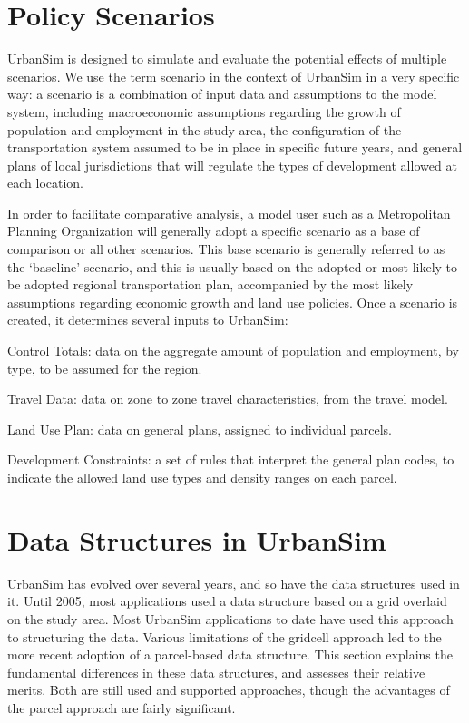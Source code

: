 \section{Policy Scenarios}

UrbanSim is designed to simulate and evaluate the potential effects of multiple scenarios.  We use the term scenario in the context of UrbanSim in a very
specific way: a scenario is a combination of input data and assumptions to the model system, including macroeconomic assumptions regarding the growth of population and employment in the study area, the configuration of the transportation system assumed to be in place in specific future years, and
general plans of local jurisdictions that will regulate the types of development allowed at each location.

In order to facilitate comparative analysis, a model user such as a Metropolitan Planning Organization will generally adopt a specific scenario as a base of comparison or all other scenarios.  This base scenario is generally referred to as the `baseline' scenario, and this is usually based on the adopted or most
likely to be adopted regional transportation plan, accompanied by the most likely assumptions regarding economic growth and land use policies.  Once a  scenario is created, it determines several inputs to UrbanSim:

\squishlist
\item Control Totals: data on the aggregate amount of population and employment, by type, to be assumed for the region.
\item Travel Data: data on zone to zone travel characteristics, from the travel model.
\item Land Use Plan: data on general plans, assigned to individual parcels.
\item Development Constraints: a set of rules that interpret the general plan codes, to indicate the allowed land use types and density ranges on each parcel.
\squishend

\section{Data Structures in UrbanSim}
UrbanSim has evolved over several years, and so have the data
structures used in it.  Until 2005, most applications used a data structure based on a grid overlaid on the study area.  Most UrbanSim applications to date have used this approach to structuring the data.  Various limitations of the gridcell approach led to the more recent adoption of a parcel-based data structure.  This section explains the fundamental differences in these data structures, and assesses their relative merits.  Both are still used and supported approaches, though the advantages of the parcel approach are fairly significant.

